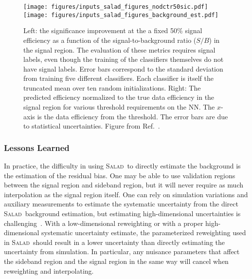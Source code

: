 \documentclass[a4paper,11pt]{article}
\begin{document}
\begin{figure}[h!]
\centering
\texttt{[image: figures/inputs\_salad\_figures\_nodctr50sic.pdf]}
\texttt{[image: figures/inputs\_salad\_figures\_background\_est.pdf]}
\caption{Left: the significance improvement at the a fixed 50\% signal efficiency as a function of the signal-to-background ratio ($S/B$) in the signal region.  The evaluation of these metrics requires signal labels, even though the training of the classifiers themselves do not have signal labels.  Error bars correspond to the standard deviation from training five different classifiers.  Each classifier is itself the truncated mean over ten random initializations.  Right: The predicted efficiency normalized to the true data efficiency in the signal region for various threshold requirements on the NN.  The $x$-axis is the data efficiency from the threshold.  The error bars are due to statistical uncertainties.  Figure from Ref.~\cite{Andreassen:2020nkr}.}
\label{fig:sensitivity}
\end{figure}



\subsubsection{Lessons Learned}

In practice, the difficulty in using \textsc{Salad}~to directly estimate the background is the estimation of the residual bias.  One may be able to use validation regions between the signal region and sideband region, but it will never require as much interpolation as the signal region itself.  One can rely on simulation variations and auxiliary measurements to estimate the systematic uncertainty from the direct \textsc{Salad}~background estimation, but estimating high-dimensional uncertainties is challenging~\cite{Nachman:2019dol,Nachman:2019yfl}.   With a low-dimensional reweighting or with a proper high-dimensional systematic uncertainty estimate, the parameterized reweighting used in \textsc{Salad}~should result in a lower uncertainty than directly estimating the uncertainty from simulation.  In particular, any nuisance parameters that affect the sideband region and the signal region in the same way will cancel when reweighting and interpolating.
\end{document}
